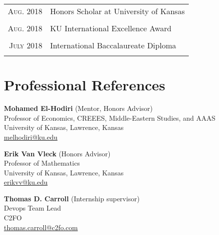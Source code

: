 \documentclass[a4paper, 10pt]{article}
\begin{document}
\begin{tabular}{rl}
	\textsc{Aug.} 2018 & Honors Scholar at University of Kansas \\\\
	\textsc{Aug.} 2018 & KU International Excellence Award      \\\\
	\textsc{July} 2018 & International Baccalaureate  Diploma   \\\\
\end{tabular}

\section{Professional References}

\textbf{Mohamed El-Hodiri} (Mentor, Honors Advisor)\\
Professor of Economics, CREEES, Middle-Eastern Studies, and AAAS\\
University of Kansas, Lawrence, Kansas\\
\href{mailto:melhodiri@ku.edu}{melhodiri@ku.edu}

\textbf{Erik Van Vleck} (Honors Advisor)\\
Professor of Mathematics\\
University of Kansas, Lawrence, Kansas\\
\href{mailto:erikvv@ku.edu}{erikvv@ku.edu}

\textbf{Thomas D. Carroll} (Internship supervisor)\\
Devops Team Lead\\
C2FO\\
\href{mailto:thomas.carroll@c2fo.com}{thomas.carroll@c2fo.com}
\end{document}
